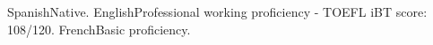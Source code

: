 \begin{cvskills}
	\cvskill
    	{Spanish}{Native.}
	\cvskill
    	{English}{Professional working proficiency - TOEFL iBT score: 108/120.}
    \cvskill
    	{French}{Basic proficiency.}
\end{cvskills}
